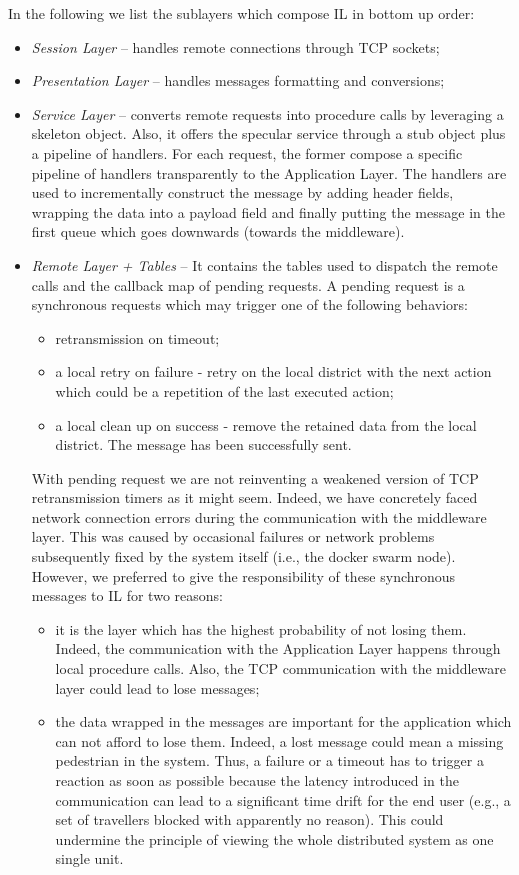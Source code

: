 In the following we list the sublayers which compose IL in
bottom up order:

\begin{itemize}
  \item \textit{Session Layer} --
  handles remote connections through TCP sockets;
  \item \textit{Presentation Layer} --
  handles messages formatting and conversions;
  \item \textit{Service Layer} --
  converts remote requests into procedure calls
  by leveraging a skeleton object.
  Also, it offers the specular service through a stub object plus a pipeline
  of handlers. For each request, the former compose a specific pipeline
  of handlers transparently to the Application Layer.
  The handlers are used to incrementally construct the message by adding
  header fields, wrapping the data into a payload field and finally putting
  the message in the first queue which goes downwards (towards the middleware).
  \item \textit{Remote Layer + Tables} --
  It contains the tables used
  to dispatch the remote calls and the callback map of pending requests.
  A pending request is a synchronous requests which may trigger one of
  the following behaviors:
  \begin{itemize}
  	\item retransmission on timeout;
  	\item a local retry on failure - retry on the local district with
  	the next action which could be a repetition of the last executed action;
  	\item a local clean up on success - remove the retained data from the local
  	district. The message has been successfully sent.
  \end{itemize}
  With pending request we are not reinventing a weakened version
  of TCP retransmission timers as it might seem.
  Indeed, we have concretely faced network connection errors during
  the communication
  with the middleware layer. This was caused by occasional failures or network
  problems subsequently fixed by the system itself
  (i.e., the docker swarm node).
  However,
  we preferred to give the responsibility of these synchronous messages to IL
  for two reasons:
  \begin{itemize}
  	\item it is the layer which has the highest probability of not losing them.
  	Indeed, the communication with the Application Layer happens through
  	local procedure
  	calls. Also, the TCP communication with the middleware layer could lead to
  	lose messages;
  	\item the data wrapped in the messages are important for the
  	application which can not afford to lose them. Indeed, a lost message
    could mean a missing pedestrian in the system. Thus, a failure
  	or a timeout has to trigger a reaction as soon as possible because
  	the latency introduced in the communication can lead to a significant
  	time drift for the end user (e.g., a set of travellers blocked with
  	apparently no reason). This could undermine the principle of viewing the
  	whole distributed system as one single unit.
  \end{itemize}
\end{itemize}